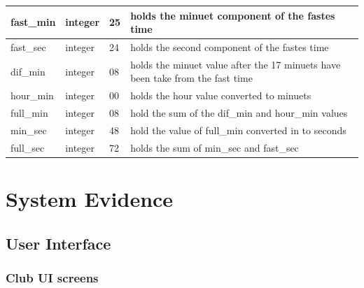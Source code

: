 \begin{longtable}{|l|l|l|p{4cm}|}
	fast\_min      & integer   & 25                    & holds the minuet component of the fastes time                                                              \\ \hline
	fast\_sec      & integer   & 24                    & holds the second component of the fastes time                                                              \\ \hline
	dif\_min       & integer   & 08                    & holds the minuet value after the 17 minuets have been take from the fast time                              \\ \hline
	hour\_min      & integer   & 00                    & holds the hour value converted to minuets                                                                  \\ \hline
	full\_min      & integer   & 08                    & hold the sum of the dif\_min and hour\_min values                                                          \\ \hline
	min\_sec       & integer   & 48                    & hold the value of full\_min converted in to seconds                                                        \\ \hline
	full\_sec      & integer   & 72                    & holds the sum of min\_sec and fast\_sec                                                                    \\ \hline
\end{longtable}

\section{System Evidence}

\clearpage
\subsection{User Interface}


\subsubsection{Club UI screens}

